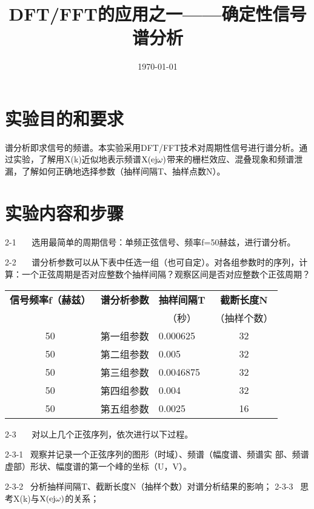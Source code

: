 \documentclass{../source/Experiment}
\title{DFT/FFT的应用之一——确定性信号谱分析}
\date{\today}
\begin{document}
    \makeheader
    \section{实验目的和要求}
    谱分析即求信号的频谱。本实验采用DFT/FFT技术对周期性信号进行谱分析。通过实验，了解用X(k)近似地表示频谱$\rm  X(ej\omega)$带来的栅栏效应、混叠现象和频谱泄漏，了解如何正确地选择参数（抽样间隔T、抽样点数N）。

    \section{实验内容和步骤}
    2-1 \,  \,  \, 选用最简单的周期信号：单频正弦信号、频率f=50赫兹，进行谱分析。

    2-2 \,  \,  \, 谱分析参数可以从下表中任选一组（也可自定）。对各组参数时的序列，计算：一个正弦周期是否对应整数个抽样间隔？观察区间是否对应整数个正弦周期？
    \begin{table}[H]
        \centering
        \begin{tabular}{|c|c|l|c|}
        \hline
        \textbf{信号频率f（赫兹）} & \textbf{谱分析参数} & \multicolumn{1}{c|}{\textbf{抽样间隔T}} & \textbf{截断长度N} \\
        \textbf{}          & \textbf{}      & \multicolumn{1}{c|}{（秒）}            & （抽样个数）         \\ \hline
        50                 & 第一组参数          & 0.000625                            & 32             \\ \hline
        50                 & 第二组参数          & 0.005                               & 32             \\ \hline
        50                 & 第三组参数          & 0.0046875                           & 32             \\ \hline
        50                 & 第四组参数          & 0.004                               & 32             \\ \hline
        50                 & 第五组参数          & 0.0025                              & 16             \\ \hline
        \end{tabular}
    \end{table}
    2-3 \,  \,  \, 对以上几个正弦序列，依次进行以下过程。

    2-3-1 \, 观察并记录一个正弦序列的图形（时域）、频谱（幅度谱、频谱实 部、频谱虚部）形状、幅度谱的第一个峰的坐标（U，V）。

    2-3-2 \, 分析抽样间隔T、截断长度N（抽样个数）对谱分析结果的影响；
    2-3-3 \, 思考X(k)与$\rm  X(ej\omega)$的关系；
\end{document}
